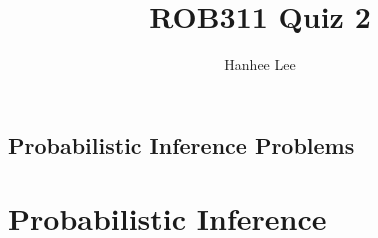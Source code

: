 \documentclass{article}
\title{ROB311 Quiz 2}
\author{Hanhee Lee}
\begin{document}
\maketitle

\tableofcontents
\newpage

\begin{center}
    \section*{Probabilistic Inference Problems}
\end{center}

\section{Probabilistic Inference}

\end{document}
